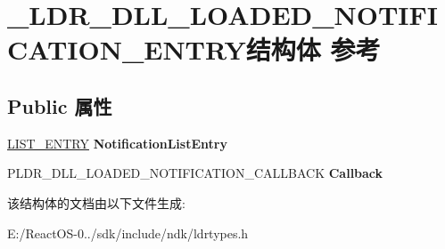 \hypertarget{struct___l_d_r___d_l_l___l_o_a_d_e_d___n_o_t_i_f_i_c_a_t_i_o_n___e_n_t_r_y}{}\section{\+\_\+\+L\+D\+R\+\_\+\+D\+L\+L\+\_\+\+L\+O\+A\+D\+E\+D\+\_\+\+N\+O\+T\+I\+F\+I\+C\+A\+T\+I\+O\+N\+\_\+\+E\+N\+T\+R\+Y结构体 参考}
\label{struct___l_d_r___d_l_l___l_o_a_d_e_d___n_o_t_i_f_i_c_a_t_i_o_n___e_n_t_r_y}
\subsection*{Public 属性}
\begin{DoxyCompactItemize}
\item 
\mbox{\label{struct___l_d_r___d_l_l___l_o_a_d_e_d___n_o_t_i_f_i_c_a_t_i_o_n___e_n_t_r_y_a71fe27227c8fd0c0cfb7a3ead222efb5}} 
\hyperlink{struct___l_i_s_t___e_n_t_r_y}{L\+I\+S\+T\+\_\+\+E\+N\+T\+RY} {\bfseries Notification\+List\+Entry}
\item 
\mbox{\label{struct___l_d_r___d_l_l___l_o_a_d_e_d___n_o_t_i_f_i_c_a_t_i_o_n___e_n_t_r_y_a9c135ebcbcfe3f82519d375c56fa8444}} 
P\+L\+D\+R\+\_\+\+D\+L\+L\+\_\+\+L\+O\+A\+D\+E\+D\+\_\+\+N\+O\+T\+I\+F\+I\+C\+A\+T\+I\+O\+N\+\_\+\+C\+A\+L\+L\+B\+A\+CK {\bfseries Callback}
\end{DoxyCompactItemize}


该结构体的文档由以下文件生成\+:\begin{DoxyCompactItemize}
\item 
E\+:/\+React\+O\+S-\/0../sdk/include/ndk/ldrtypes.\+h\end{DoxyCompactItemize}

